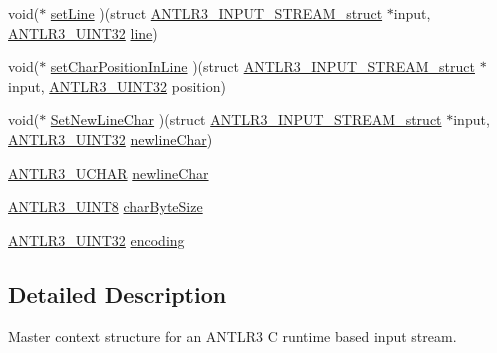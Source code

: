 \begin{DoxyCompactItemize}
\item 
void($\ast$ \hyperlink{struct_a_n_t_l_r3___i_n_p_u_t___s_t_r_e_a_m__struct_a29cecb04980a396b5b7a928f53117bd2}{set\-Line} )(struct \hyperlink{struct_a_n_t_l_r3___i_n_p_u_t___s_t_r_e_a_m__struct}{A\-N\-T\-L\-R3\-\_\-\-I\-N\-P\-U\-T\-\_\-\-S\-T\-R\-E\-A\-M\-\_\-struct} $\ast$input, \hyperlink{antlr3defs_8h_ac41f744abd0fd25144b9eb9d11b1dfd1}{A\-N\-T\-L\-R3\-\_\-\-U\-I\-N\-T32} \hyperlink{struct_a_n_t_l_r3___i_n_p_u_t___s_t_r_e_a_m__struct_a6339fbb583899850cc6647706c60f197}{line})
\item 
void($\ast$ \hyperlink{struct_a_n_t_l_r3___i_n_p_u_t___s_t_r_e_a_m__struct_a8f2a47c8b7ffaea9466ba01a39b35bba}{set\-Char\-Position\-In\-Line} )(struct \hyperlink{struct_a_n_t_l_r3___i_n_p_u_t___s_t_r_e_a_m__struct}{A\-N\-T\-L\-R3\-\_\-\-I\-N\-P\-U\-T\-\_\-\-S\-T\-R\-E\-A\-M\-\_\-struct} $\ast$input, \hyperlink{antlr3defs_8h_ac41f744abd0fd25144b9eb9d11b1dfd1}{A\-N\-T\-L\-R3\-\_\-\-U\-I\-N\-T32} position)
\item 
void($\ast$ \hyperlink{struct_a_n_t_l_r3___i_n_p_u_t___s_t_r_e_a_m__struct_a08d57c74e1b52ad004ea0f7fc93ae76b}{Set\-New\-Line\-Char} )(struct \hyperlink{struct_a_n_t_l_r3___i_n_p_u_t___s_t_r_e_a_m__struct}{A\-N\-T\-L\-R3\-\_\-\-I\-N\-P\-U\-T\-\_\-\-S\-T\-R\-E\-A\-M\-\_\-struct} $\ast$input, \hyperlink{antlr3defs_8h_ac41f744abd0fd25144b9eb9d11b1dfd1}{A\-N\-T\-L\-R3\-\_\-\-U\-I\-N\-T32} \hyperlink{struct_a_n_t_l_r3___i_n_p_u_t___s_t_r_e_a_m__struct_a2a7261f49bf42f8101b598f85ad86486}{newline\-Char})
\item 
\hyperlink{antlr3defs_8h_a078eec1343cdbb862af80f352ea701da}{A\-N\-T\-L\-R3\-\_\-\-U\-C\-H\-A\-R} \hyperlink{struct_a_n_t_l_r3___i_n_p_u_t___s_t_r_e_a_m__struct_a2a7261f49bf42f8101b598f85ad86486}{newline\-Char}
\item 
\hyperlink{antlr3defs_8h_a785358a47238c5936f6bb88108ebbb7e}{A\-N\-T\-L\-R3\-\_\-\-U\-I\-N\-T8} \hyperlink{struct_a_n_t_l_r3___i_n_p_u_t___s_t_r_e_a_m__struct_aaac6c588f4b1817939ff796074ff494b}{char\-Byte\-Size}
\item 
\hyperlink{antlr3defs_8h_ac41f744abd0fd25144b9eb9d11b1dfd1}{A\-N\-T\-L\-R3\-\_\-\-U\-I\-N\-T32} \hyperlink{struct_a_n_t_l_r3___i_n_p_u_t___s_t_r_e_a_m__struct_acce3c7aa90181c9e636829746ad666b0}{encoding}
\end{DoxyCompactItemize}


\subsection{Detailed Description}
Master context structure for an A\-N\-T\-L\-R3 C runtime based input stream. 

